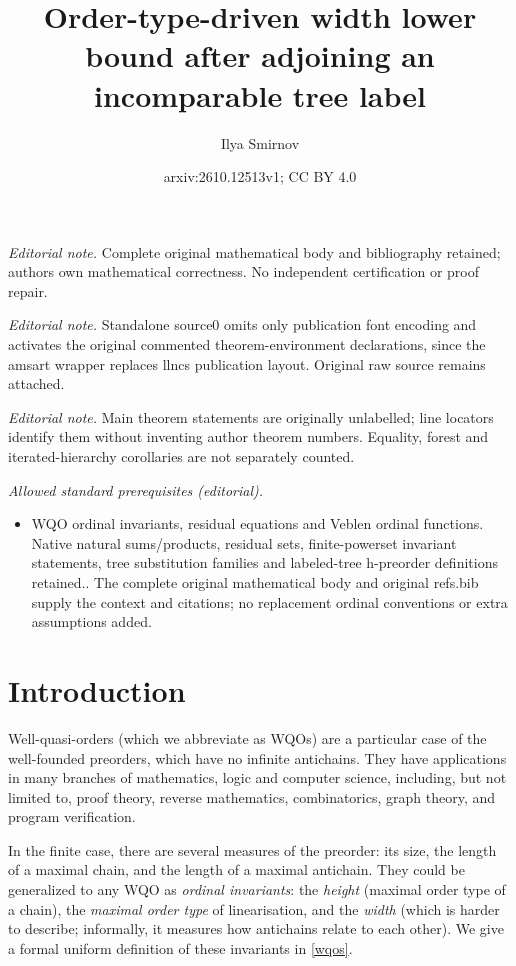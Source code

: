 \documentclass[10pt,a4paper]{amsart}
\title{Order-type-driven width lower bound after adjoining an incomparable tree label}
\author{Ilya Smirnov}
\date{arxiv:2610.12513v1; CC BY 4.0}
\begin{document}
\maketitle
\noindent\textit{Editorial note.} Complete original mathematical body and bibliography retained; authors own mathematical correctness. No independent certification or proof repair.\par\medskip
\noindent\textit{Editorial note.} Standalone source0 omits only publication font encoding and activates the original commented theorem-environment declarations, since the amsart wrapper replaces llncs publication layout. Original raw source remains attached.\par\medskip
\noindent\textit{Editorial note.} Main theorem statements are originally unlabelled; line locators identify them without inventing author theorem numbers. Equality, forest and iterated-hierarchy corollaries are not separately counted.\par\medskip
\noindent\textit{Allowed standard prerequisites (editorial).}\begin{itemize}
\item WQO ordinal invariants, residual equations and Veblen ordinal functions. Native natural sums/products, residual sets, finite-powerset invariant statements, tree substitution families and labeled-tree h-preorder definitions retained.. The complete original mathematical body and original refs.bib supply the context and citations; no replacement ordinal conventions or extra assumptions added.
\end{itemize}\medskip
\section{Introduction}

Well-quasi-orders (which we abbreviate as WQOs) are a particular case of the well-founded preorders, which have no infinite antichains. They have applications in many branches of mathematics, logic and computer science, including, but not limited to, proof theory, reverse mathematics, combinatorics, graph theory, and program verification.

In the finite case, there are several measures of the preorder: its size, the length of a maximal chain, and the length of a maximal antichain. They could be generalized to any WQO as \textit{ordinal invariants}: the \textit{height} (maximal order type of a chain), the \textit{maximal order type} of linearisation, and the \textit{width} (which is harder to describe; informally, it measures how antichains relate to each other). We give a formal uniform definition of these invariants in \cref{wqos}.
\end{document}

